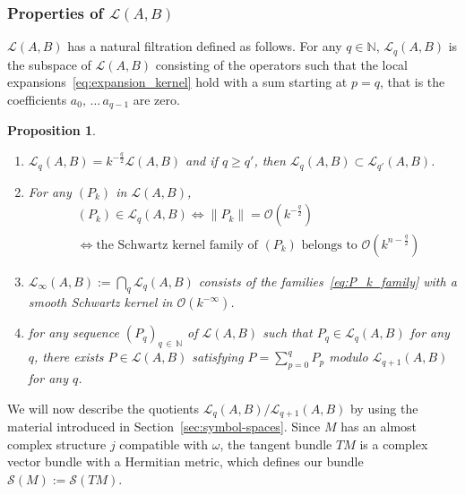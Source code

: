 \documentclass[10pt,a4paper]{article}
\newtheorem{prop}[theo]{Proposition}
\theoremstyle{definition}
\numberwithin{equation}{section}
\newcommand{\N}{{\mathbb{N}}}
\newcommand{\om}{{\omega}}
\newcommand{\bigo}{\mathcal{O}}
\newcommand{\symb}{\mathcal{S}}
\newcommand{\lag}{\mathcal{L}}
\begin{document}
\subsubsection{Properties of $\lag (A,B)$}

$\lag (A, B)$ has a natural filtration defined as follows. For any $q \in
\N$, $\lag _q (A, B)$ is the subspace of $\lag (A,B)$ consisting of the operators such that the local expansions~\eqref{eq:expansion_kernel} hold with a sum starting at $p = q$, that is the coefficients $a_0,\, \ldots\,a_{q-1}$ are zero.

\begin{prop}\label{prop:lag}\leavevmode
\begin{enumerate}
\item\label{prop2.2.1} $\lag _q (A, B) = k^{-\frac{q}{2}}
\lag (A, B)$ and if $q \geqslant q'$, then $\lag_q(A,B) \subset \lag_{q'} (A,B)$.
\item\label{prop2.2.2} For any $(P_k)$ in $\lag (A, B)$,
\begin{align*}
&(P_k) \in \lag_q(A,B) \Leftrightarrow \| P_k \| = \bigo \left(k^{-\frac{q}{2}}\right) \\
&\Leftrightarrow \text{the Schwartz kernel family of $(P_k)$ belongs to }
\bigo \left(k^{n-\frac{q}{2}}\right)
\end{align*}
\item\label{prop2.2.3} $\lag_{\infty} (A,B) := \bigcap_q \lag_q(A,B)$ consists of the families~\eqref{eq:P_k_family} with a smooth Schwartz kernel in $ \bigo (k^{-\infty})$.
\item\label{prop2.2.4} for any sequence $(P_q)_{q\,\in\,\N}$ of $\lag (A,B)$ such that $P_q \in \lag_q(A, B)$ for any $q$, there exists $P \in \lag (A,B)$ satisfying $P = \sum_{p=0}^q P_p$ modulo $\lag_{q+1} (A,B)$ for any $q$.
\end{enumerate}
\end{prop}

We will now describe the quotients $\lag_q (A,B)/ \lag_{q+1} (A,B)$ by using the material introduced in Section~\ref{sec:symbol-spaces}. Since $M$ has an almost complex structure $j$ compatible with $\om$, the tangent bundle $TM$ is a complex vector bundle with a Hermitian metric, which defines our bundle $\symb (M) := \symb (TM)$.
\end{document}
